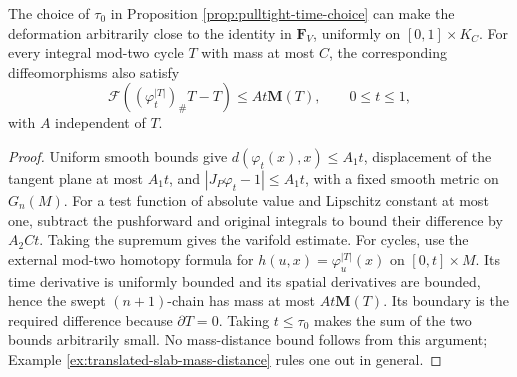 \begin{lemma}\label{lem:pulltight-near-identity}
The choice of $\tau_0$ in Proposition \ref{prop:pulltight-time-choice} can make the deformation arbitrarily close to the identity in $\mathbf F_V$, uniformly on $[0,1]\times K_C$. For every integral mod-two cycle $T$ with mass at most $C$, the corresponding diffeomorphisms also satisfy
\[
 \mathcal F((\varphi_t^{|T|})_\#T-T)\leq A t\mathbf M(T),\qquad 0\leq t\leq1,
\]
with $A$ independent of $T$.
\end{lemma}
\begin{proof}
Uniform smooth bounds give $d(\varphi_t(x),x)\leq A_1t$, displacement of the tangent plane at most $A_1t$, and $|J_P\varphi_t-1|\leq A_1t$, with a fixed smooth metric on $G_n(M)$. For a test function of absolute value and Lipschitz constant at most one, subtract the pushforward and original integrals to bound their difference by $A_2Ct$. Taking the supremum gives the varifold estimate. For cycles, use the external mod-two homotopy formula for $h(u,x)=\varphi_u^{|T|}(x)$ on $[0,t]\times M$. Its time derivative is uniformly bounded and its spatial derivatives are bounded, hence the swept $(n+1)$-chain has mass at most $At\mathbf M(T)$. Its boundary is the required difference because $\partial T=0$. Taking $t\leq\tau_0$ makes the sum of the two bounds arbitrarily small. No mass-distance bound follows from this argument; Example \ref{ex:translated-slab-mass-distance} rules one out in general.
\end{proof}

